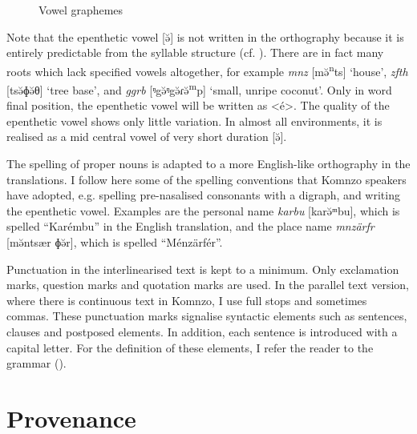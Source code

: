 \begin{figure}
\centering
{
\begin{vowel}[plain]
\end{vowel}
}%
\caption{Vowel graphemes} \label{orthogvow}
\end{figure}

Note that the epenthetic vowel [ə̆] is not written in the orthography because it is entirely predictable from the syllable structure (cf. \cite[67ff.]{Dohler:2018qt}). There are in fact many roots which lack specified vowels altogether, for example \emph{mnz} [mə̆\textsuperscript{n}ts] `house', \emph{zfth} [tsə̆ɸə̆θ] `tree base', and \emph{ggrb} [{ᵑ}gə̆{ᵑ}gə̆ɾə̆\textsuperscript{m}p] `small, unripe coconut'. Only in word final position, the epenthetic vowel will be written as <é>. The quality of the epenthetic vowel shows only little variation. In almost all environments, it is realised as a mid central vowel of very short duration [ə̆].

The spelling of proper nouns is adapted to a more English-like orthography in the translations. I follow here some of the spelling conventions that Komnzo speakers have adopted, e.g. spelling pre-nasalised consonants with a digraph, and writing the epenthetic vowel. Examples are the personal name \textit{karbu} [karə̆ᵐbu], which is spelled ``Karémbu'' in the English translation, and the place name \textit{mnzärfr} [mə̆ntsær ɸə̆r], which is spelled ``Ménzärfér''.

Punctuation in the interlinearised text is kept to a minimum. Only exclamation marks, question marks and quotation marks are used. In the parallel text version, where there is continuous text in Komnzo, I use full stops and sometimes commas. These punctuation marks signalise syntactic elements such as sentences, clauses and postposed elements. In addition, each sentence is introduced with a capital letter. For the definition of these elements, I refer the reader to the grammar (\cite{Dohler:2018qt}).

\newpage
\section{Provenance}\label{sec:data}


